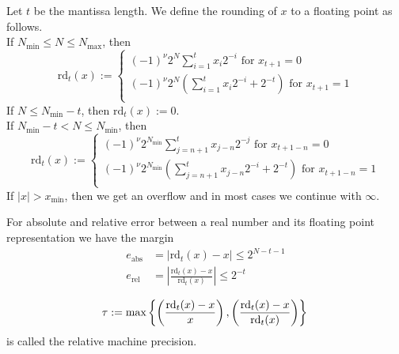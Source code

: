 \begin{definition} \label{theo:round}
    Let \(t\) be the mantissa length. We define the rounding of \(x\) to a floating point as follows. \\
    If \(N_{\text{min}} \leq N \leq N_{\text{max}}\), then
    \begin{equation*}
        \text{rd}_t(x) :=
        \begin{cases}
            (-1)^{\nu} 2^N \sum_{i = 1}^{t}x_i 2^{-i} \text{ for } x_{t+1} = 0 \\
            (-1)^{\nu} 2^N (\sum_{i = 1}^{t}x_i 2^{-i} + 2^{-t}) \text{ for } x_{t+1} = 1 \\
        \end{cases}
    \end{equation*}
    If \(N \leq N_{\text{min}} - t\), then \(\text{rd}_t(x) := 0\). \\
    If \(N_{\text{min}} - t < N \leq N_{\text{min}}\), then
    \begin{equation*}
        \text{rd}_t(x) :=
        \begin{cases}
            (-1)^{\nu} 2^{N_{\text{min}}} \sum_{j = n + 1}^{t}x_{j-n} 2^{-j} \text{ for } x_{t+1-n} = 0 \\
            (-1)^{\nu} 2^{N_{\text{min}}} (\sum_{j = n + 1}^{t}x_{j-n} 2^{-i} + 2^{-t}) \text{ for } x_{t+1-n} = 1 \\
        \end{cases}
    \end{equation*}
    If \(|x| > x_{\text{min}}\), then we get an overflow and in most cases we continue with \(\infty\).  \cite{bib:rabus}
\end{definition}
%
\begin{lemma} \label{theo:margin}
    For absolute and relative error between a real number and its floating point representation we have the margin  \cite{bib:rabus}
    \begin{align*}
        e_{\text{abs}} &= | \text{rd}_t(x) - x | \leq 2^{N - t - 1} \\
        e_{\text{rel}} &= \left| \frac{\text{rd}_t(x) - x}{\text{rd}_t(x)} \right| \leq 2^{-t}
    \end{align*}
\end{lemma}
%
\begin{definition}
    \begin{equation*}
        \tau := \text{max} \left\{ \left( \frac{\text{rd}_t(x) - x}{x}\right), \left( \frac{\text{rd}_t(x) - x}{\text{rd}_t(x)} \right) \right\} \\
    \end{equation*}
    is called the relative machine precision.  \cite{bib:rabus}
\end{definition}